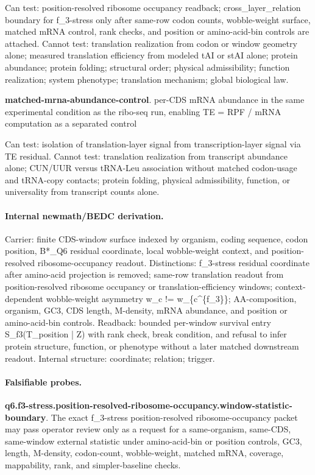 Can test: position-resolved ribosome occupancy readback; cross\_layer\_relation boundary for f\_3-stress only after same-row codon counts, wobble-weight surface, matched mRNA control, rank checks, and position or amino-acid-bin controls are attached. Cannot test: translation realization from codon or window geometry alone; measured translation efficiency from modeled tAI or stAI alone; protein abundance; protein folding; structural order; physical admissibility; function realization; system phenotype; translation mechanism; global biological law.

\textbf{matched-mrna-abundance-control}. per-CDS mRNA abundance in the same experimental condition as the ribo-seq run, enabling TE = RPF / mRNA computation as a separated control

Can test: isolation of translation-layer signal from transcription-layer signal via TE residual. Cannot test: translation realization from transcript abundance alone; CUN/UUR versus tRNA-Leu association without matched codon-usage and tRNA-copy contacts; protein folding, physical admissibility, function, or universality from transcript counts alone.

\paragraph{Internal newmath/BEDC derivation.} Carrier: finite CDS-window surface indexed by organism, coding sequence, codon position, B*\_Q6 residual coordinate, local wobble-weight context, and position-resolved ribosome-occupancy readout. Distinctions: f\_3-stress residual coordinate after amino-acid projection is removed; same-row translation readout from position-resolved ribosome occupancy or translation-efficiency windows; context-dependent wobble-weight asymmetry w\_c != w\_\{c\textasciicircum{}\{f\_3\}\}; AA-composition, organism, GC3, CDS length, M-density, mRNA abundance, and position or amino-acid-bin controls. Readback: bounded per-window survival entry S\_f3(T\_position | Z) with rank check, break condition, and refusal to infer protein structure, function, or phenotype without a later matched downstream readout. Internal structure: coordinate; relation; trigger.

\paragraph{Falsifiable probes.}
\textbf{q6.f3-stress.position-resolved-ribosome-occupancy.window-statistic-boundary}. The exact f\_3-stress position-resolved ribosome-occupancy packet may pass operator review only as a request for a same-organism, same-CDS, same-window external statistic under amino-acid-bin or position controls, GC3, length, M-density, codon-count, wobble-weight, matched mRNA, coverage, mappability, rank, and simpler-baseline checks.

